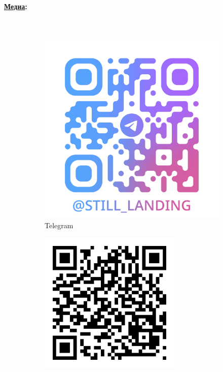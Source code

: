 \documentclass[a4paper,12pt]{article} %
\begin{document}
\paragraph{\underline{Медиа}:}\
\begin{figure}[h]
    \centering
    \begin{subfigure}{0.2\textwidth}
    \end{subfigure}
    \hfill
    \centering
    \begin{subfigure}{0.2\textwidth}
        \includegraphics[width=\linewidth]{../img/tg-qr-code.png}
        \caption*{Telegram}
    \end{subfigure}
    \hfill
    \centering
    \begin{subfigure}{0.2\textwidth}
        \includegraphics[width=\linewidth]{../img/git-qr-code.png}

\end{subfigure}
\end{figure}
\end{document}
